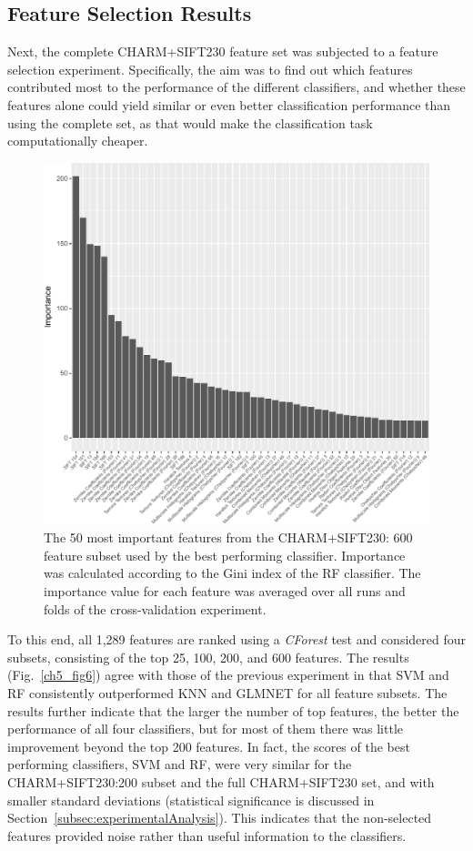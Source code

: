 \subsection{Feature Selection Results}
\label{subsec:featureSelectionResults}
Next, the complete CHARM+SIFT230 feature set was subjected to a feature selection experiment. Specifically, the aim was to find out which features contributed most to the performance of the different classifiers, and whether these features alone could yield similar or even better classification performance than using the complete set, as that would make the classification task computationally cheaper.
\begin{figure}[h!]
	\centering
	\includegraphics[width=\columnwidth]{fig08}
	\caption{The 50 most important features from the CHARM+SIFT230: 600 feature subset used by the best performing classifier. Importance was calculated according to the Gini index of the RF classifier. The importance value for each feature was averaged over all runs and folds of the cross-validation experiment.}
	\label{ch5_fig8}
\end{figure}
To this end, all 1,289 features are ranked using a \textit{CForest} test \cite{strobl2009party} and considered four subsets, consisting of the top 25, 100, 200, and 600 features. The results (Fig.~\ref{ch5_fig6}) agree with those of the previous experiment in that SVM and RF consistently outperformed KNN and GLMNET for all feature subsets. The results further indicate that the larger the number of top features, the better the performance of all four classifiers, but for most of them there was little improvement beyond the top 200 features. In fact, the scores of the best performing classifiers, SVM and RF, were very similar for the CHARM+SIFT230:200 subset and the full CHARM+SIFT230 set, and with smaller standard deviations (statistical significance is discussed in Section~\ref{subsec:experimentalAnalysis}). This indicates that the non-selected features provided noise rather than useful information to the classifiers.

